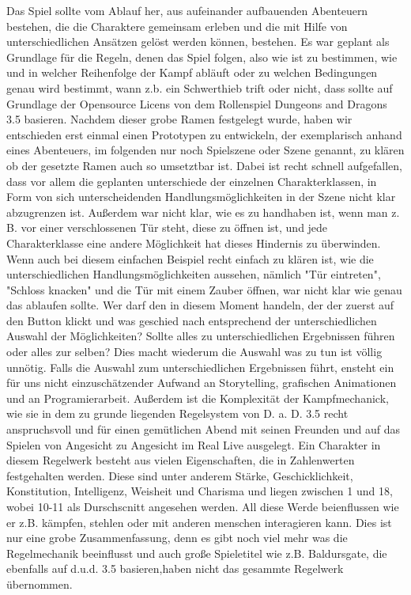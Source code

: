 Das Spiel sollte vom Ablauf her, aus aufeinander aufbauenden Abenteuern bestehen, die die Charaktere gemeinsam erleben und die mit Hilfe von unterschiedlichen Ansätzen gelöst werden können, bestehen.
Es war geplant als Grundlage für die Regeln, denen das Spiel folgen, also wie ist zu bestimmen, wie und in welcher Reihenfolge der Kampf abläuft oder zu welchen Bedingungen genau wird bestimmt, wann z.b. ein Schwerthieb trift oder nicht, dass sollte auf Grundlage der Opensource Licens von dem Rollenspiel Dungeons and Dragons 3.5 basieren.
Nachdem dieser grobe Ramen festgelegt wurde, haben wir entschieden erst einmal einen Prototypen zu entwickeln, der exemplarisch anhand eines Abenteuers, im folgenden nur noch Spielszene oder Szene genannt, zu klären ob der gesetzte Ramen auch so umsetztbar ist. 
Dabei ist recht schnell aufgefallen, dass vor allem die geplanten unterschiede der einzelnen Charakterklassen, in Form von sich unterscheidenden Handlungsmöglichkeiten in der Szene nicht klar abzugrenzen ist. Außerdem war nicht klar, wie es zu handhaben ist, wenn man z. B. vor einer verschlossenen Tür steht, diese zu öffnen ist, und jede Charakterklasse eine andere Möglichkeit hat dieses Hindernis zu überwinden. Wenn auch bei diesem einfachen Beispiel recht einfach zu klären ist, wie die unterschiedlichen Handlungsmöglichkeiten aussehen, nämlich "Tür eintreten", "Schloss knacken" und die Tür mit einem Zauber öffnen, war nicht klar wie genau das ablaufen sollte. Wer darf den in diesem Moment handeln, der der zuerst auf den Button klickt und was geschied nach entsprechend der unterschiedlichen Auswahl der Möglichkeiten? Sollte alles zu unterschiedlichen Ergebnissen führen oder alles zur selben? Dies macht wiederum die Auswahl was zu tun ist völlig unnötig. Falls die Auswahl zum unterschiedlichen Ergebnissen führt, ensteht ein für uns nicht einzuschätzender Aufwand an Storytelling, grafischen Animationen und an Programierarbeit. Außerdem ist die Komplexität der Kampfmechanick, wie sie in dem zu grunde liegenden Regelsystem von D. a. D. 3.5 recht anspruchsvoll und für einen gemütlichen Abend mit seinen Freunden und auf das Spielen von Angesicht zu Angesicht im Real Live ausgelegt. 
Ein Charakter in diesem Regelwerk besteht aus vielen Eigenschaften, die in Zahlenwerten festgehalten werden. Diese sind unter anderem Stärke, Geschicklichkeit, Konstitution, Intelligenz, Weisheit und Charisma und liegen zwischen 1 und 18, wobei 10-11 als Durschscnitt angesehen werden. All diese Werde beienflussen wie er z.B. kämpfen, stehlen oder mit anderen menschen interagieren kann. Dies ist nur eine grobe Zusammenfassung, denn es gibt noch viel mehr was die Regelmechanik beeinflusst und auch große Spieletitel wie z.B. Baldursgate, die ebenfalls auf d.u.d. 3.5 basieren,haben nicht das gesammte Regelwerk übernommen. 
